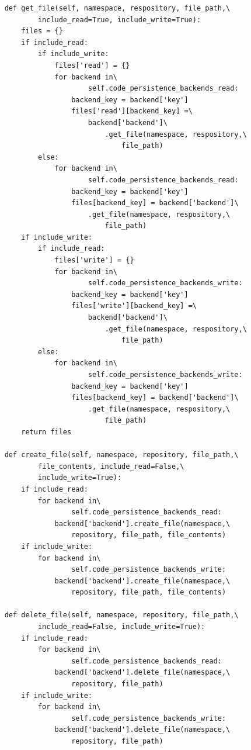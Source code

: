 \begin{lstlisting}
    def get_file(self, namespace, respository, file_path,\
            include_read=True, include_write=True):
        files = {}
        if include_read:
            if include_write:
                files['read'] = {}
                for backend in\
                        self.code_persistence_backends_read:
                    backend_key = backend['key']
                    files['read'][backend_key] =\
                        backend['backend']\
                            .get_file(namespace, respository,\
                                file_path)
            else:
                for backend in\
                        self.code_persistence_backends_read:
                    backend_key = backend['key']
                    files[backend_key] = backend['backend']\
                        .get_file(namespace, respository,\
                            file_path)
        if include_write:
            if include_read:
                files['write'] = {}
                for backend in\
                        self.code_persistence_backends_write:
                    backend_key = backend['key']
                    files['write'][backend_key] =\
                        backend['backend']\
                            .get_file(namespace, respository,\
                                file_path)
            else:
                for backend in\
                        self.code_persistence_backends_write:
                    backend_key = backend['key']
                    files[backend_key] = backend['backend']\
                        .get_file(namespace, respository,\
                            file_path)
        return files

    def create_file(self, namespace, repository, file_path,\
            file_contents, include_read=False,\
            include_write=True):
        if include_read:
            for backend in\
                    self.code_persistence_backends_read:
                backend['backend'].create_file(namespace,\
                    repository, file_path, file_contents)
        if include_write:
            for backend in\
                    self.code_persistence_backends_write:
                backend['backend'].create_file(namespace,\
                    repository, file_path, file_contents)

    def delete_file(self, namespace, repository, file_path,\
            include_read=False, include_write=True):
        if include_read:
            for backend in\
                    self.code_persistence_backends_read:
                backend['backend'].delete_file(namespace,\
                    repository, file_path)
        if include_write:
            for backend in\
                    self.code_persistence_backends_write:
                backend['backend'].delete_file(namespace,\
                    repository, file_path)


\end{lstlisting}
